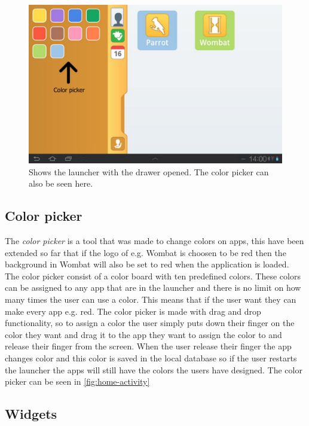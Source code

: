 \begin{figure}[h!]
	\centering
	\includegraphics[scale=0.2]{gfx/home-activity_open}
	\caption{Shows the launcher with the drawer opened. The color picker can also be seen here.}
	\label{fig:home-activity}
\end{figure}

\subsection{Color picker}\label{color:picker}

The \textit{color picker} is a tool that was made to change colors on apps, this have been extended so far that if the logo of e.g. Wombat is choosen to be red then the background in Wombat will also be set to red when the application is loaded.
The color picker consist of a color board with ten predefined \giraf[] colors. These colors can be assigned to any app that are in the launcher and there is no limit on how many times the user can use a color. This means that if the user want they can make every app e.g. red.
The color picker is made with drag and drop functionality, so to assign a color the user simply puts down their finger on the color they want and drag it to the app they want to assign the color to and release their finger from the screen.
When the user release their finger the app changes color and this color is saved in the local database so if the user restarts the launcher the apps will still have the colors the users have designed. 
The color picker can be seen in \autoref{fig:home-activity}


\subsection{Widgets}

